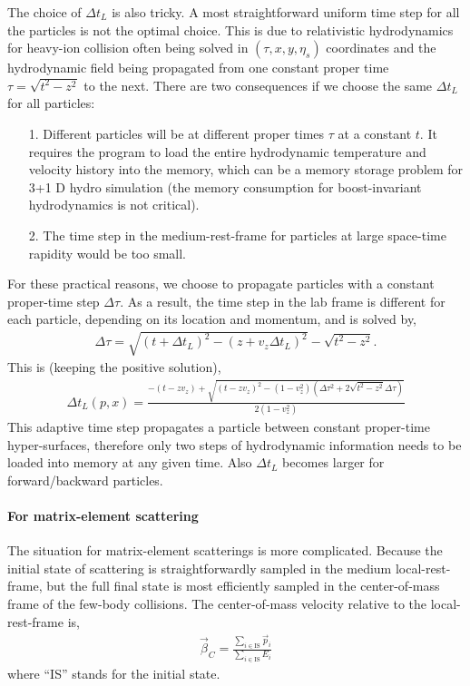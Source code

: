 The choice of $\Delta t_L$ is also tricky. 
A most straightforward uniform time step for all the particles is not the optimal choice.
This is due to relativistic hydrodynamics for heavy-ion collision often being solved in $(\tau,x,y,\eta_s)$ coordinates and the hydrodynamic field being propagated from one constant proper time $\tau = \sqrt{t^2 - z^2}$ to the next.
There are two consequences if we choose the same $\Delta t_L$ for all particles:
\begin{itemize}
\item[1.] Different particles will be at different proper times $\tau$ at a constant $t$. It requires the program to load the entire hydrodynamic temperature and velocity history into the memory, which can be a memory storage problem for 3+1 D hydro simulation (the memory consumption for boost-invariant hydrodynamics is not critical).
\item[2.] The time step in the medium-rest-frame for particles at large space-time rapidity would be too small.
\end{itemize}
For these practical reasons, we choose to propagate particles with a constant proper-time step $\Delta \tau$. 
As a result, the time step in the lab frame is different for each particle, depending on its location and momentum, and is solved by,
\begin{eqnarray}
\Delta \tau = \sqrt{(t+\Delta t_L)^2 - (z+v_z \Delta t_L)^2} - \sqrt{t^2 - z^2}.
\end{eqnarray}
This is (keeping the positive solution),
\begin{eqnarray}
\Delta t_L(p, x) = \frac{-(t-z v_z) + \sqrt{(t-z v_z)^2 - (1-v_z^2)(\Delta \tau^2 + 2\sqrt{t^2 - z^2}\Delta \tau )}}{2(1-v_z^2)}
\label{eq:dt-transformation}
\end{eqnarray}
This adaptive time step propagates a particle between constant proper-time hyper-surfaces, therefore only two steps of hydrodynamic information needs to be loaded into memory at any given time.
Also $\Delta t_L$ becomes larger for forward/backward particles.

\paragraph{For matrix-element scattering} The situation for matrix-element scatterings is more complicated.
Because the initial state of scattering is straightforwardly sampled in the medium local-rest-frame, but the full final state is most efficiently sampled in the center-of-mass frame of the few-body collisions.
The center-of-mass velocity relative to the local-rest-frame is,
\begin{eqnarray}
\vec{\beta}_{C} = \frac{\sum_{i\in \textrm{IS}} \vec{p}_i}{\sum_{i\in \textrm{IS}} E_i}
\end{eqnarray}
where ``IS'' stands for the initial state.


